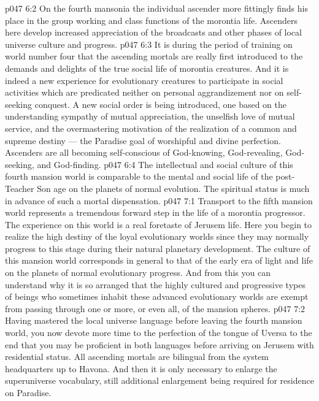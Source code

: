 \vs p047 6:2 On the fourth mansonia the individual ascender more fittingly finds his place in the group working and class functions of the morontia life. Ascenders here develop increased appreciation of the broadcasts and other phases of local universe culture and progress.
\vs p047 6:3 It is during the period of training on world number four that the ascending mortals are really first introduced to the demands and delights of the true social life of morontia creatures. And it is indeed a new experience for evolutionary creatures to participate in social activities which are predicated neither on personal aggrandizement nor on self\hyp{}seeking conquest. A new social order is being introduced, one based on the understanding sympathy of mutual appreciation, the unselfish love of mutual service, and the overmastering motivation of the realization of a common and supreme destiny --- the Paradise goal of worshipful and divine perfection. Ascenders are all becoming self\hyp{}conscious of God\hyp{}knowing, God\hyp{}revealing, God\hyp{}seeking, and God\hyp{}finding.
\vs p047 6:4 The intellectual and social culture of this fourth mansion world is comparable to the mental and social life of the post\hyp{}Teacher Son age on the planets of normal evolution. The spiritual status is much in advance of such a mortal dispensation.
\vs p047 7:1 Transport to the fifth mansion world represents a tremendous forward step in the life of a morontia progressor. The experience on this world is a real foretaste of Jerusem life. Here you begin to realize the high destiny of the loyal evolutionary worlds since they may normally progress to this stage during their natural planetary development. The culture of this mansion world corresponds in general to that of the early era of light and life on the planets of normal evolutionary progress. And from this you can understand why it is so arranged that the highly cultured and progressive types of beings who sometimes inhabit these advanced evolutionary worlds are exempt from passing through one or more, or even all, of the mansion spheres.
\vs p047 7:2 Having mastered the local universe language before leaving the fourth mansion world, you now devote more time to the perfection of the tongue of Uversa to the end that you may be proficient in both languages before arriving on Jerusem with residential status. All ascending mortals are bilingual from the system headquarters up to Havona. And then it is only necessary to enlarge the superuniverse vocabulary, still additional enlargement being required for residence on Paradise.
